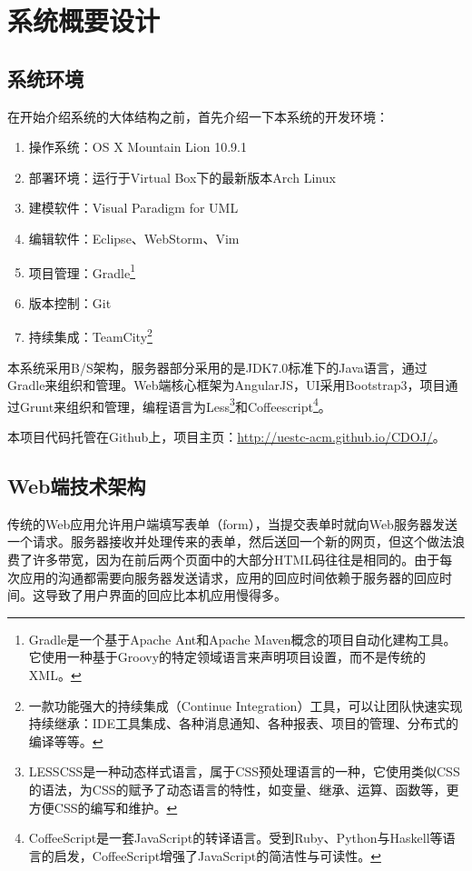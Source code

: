
\chapter{系统概要设计}
\section{系统环境}
在开始介绍系统的大体结构之前，首先介绍一下本系统的开发环境：
\begin{enumerate}
	\item 操作系统：OS X Mountain Lion 10.9.1
	\item 部署环境：运行于Virtual Box下的最新版本Arch Linux
	\item 建模软件：Visual Paradigm for UML
	\item 编辑软件：Eclipse、WebStorm、Vim
	\item 项目管理：Gradle\footnote{Gradle是一个基于Apache Ant和Apache Maven概念的项目自动化建构工具。它使用一种基于Groovy的特定领域语言来声明项目设置，而不是传统的XML。}
	\item 版本控制：Git
	\item 持续集成：TeamCity\footnote{一款功能强大的持续集成（Continue Integration）工具，可以让团队快速实现持续继承：IDE工具集成、各种消息通知、各种报表、项目的管理、分布式的编译等等。}
\end{enumerate}

本系统采用B/S架构，服务器部分采用的是JDK7.0标准下的Java语言，通过Gradle来组织和管理。Web端核心框架为AngularJS，UI采用Bootstrap3，项目通过Grunt来组织和管理，编程语言为Less\footnote{LESSCSS是一种动态样式语言，属于CSS预处理语言的一种，它使用类似CSS的语法，为CSS的赋予了动态语言的特性，如变量、继承、运算、函数等，更方便CSS的编写和维护。}和Coffeescript\footnote{CoffeeScript是一套JavaScript的转译语言。受到Ruby、Python与Haskell等语言的启发，CoffeeScript增强了JavaScript的简洁性与可读性。}。

本项目代码托管在Github上，项目主页：\url{http://uestc-acm.github.io/CDOJ/}。

\section{Web端技术架构}
传统的Web应用允许用户端填写表单（form），当提交表单时就向Web服务器发送一个请求。服务器接收并处理传来的表单，然后送回一个新的网页，但这个做法浪费了许多带宽，因为在前后两个页面中的大部分HTML码往往是相同的。由于每次应用的沟通都需要向服务器发送请求，应用的回应时间依赖于服务器的回应时间。这导致了用户界面的回应比本机应用慢得多。

